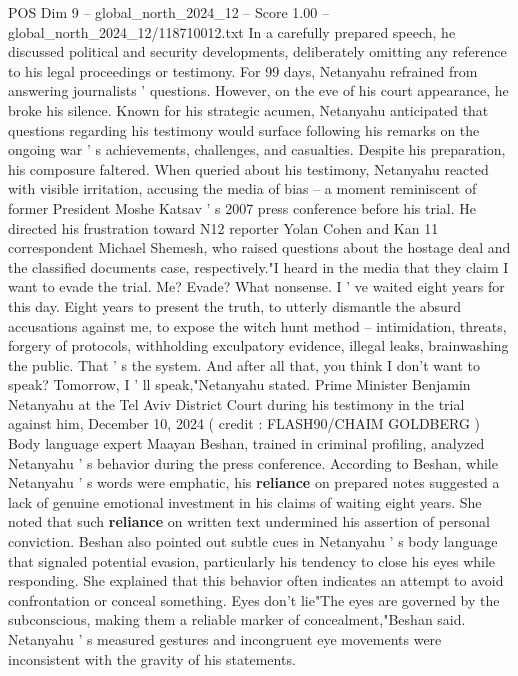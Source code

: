\begin{textsample}{POS Dim 9 – global\_north\_2024\_12 – Score 1.00 – global\_north\_2024\_12/118710012.txt}  \label{ex:f9_pos_333}
In a carefully prepared speech, he discussed political and security developments, deliberately omitting any reference to his legal proceedings or testimony.
For 99 days, Netanyahu refrained from answering journalists ' questions.
However, on the eve of his court appearance, he broke his silence.
Known for his strategic acumen, Netanyahu anticipated that questions regarding his testimony would surface following his remarks on the ongoing war ' s achievements, challenges, and casualties.
Despite his preparation, his composure faltered.
When queried about his testimony, Netanyahu reacted with visible irritation, accusing the media of bias -- a moment reminiscent of former President Moshe Katsav ' s 2007 press conference before his trial.
He directed his frustration toward N12 reporter Yolan Cohen and Kan 11 correspondent Michael Shemesh, who raised questions about the hostage deal and the classified documents case, respectively."I heard in the media that they claim I want to evade the trial.
Me?
Evade?
What nonsense.
I ' ve waited eight years for this day.
Eight years to present the truth, to utterly dismantle the absurd accusations against me, to expose the witch hunt method -- intimidation, threats, forgery of protocols, withholding exculpatory evidence, illegal leaks, brainwashing the public.
That ' s the system.
And after all that, you think I don't want to speak?
Tomorrow, I ' ll speak,"Netanyahu stated.
Prime Minister Benjamin Netanyahu at the Tel Aviv District Court during his testimony in the trial against him, December 10, 2024 ( credit : FLASH90/CHAIM GOLDBERG ) Body language expert Maayan Beshan, trained in criminal profiling, analyzed Netanyahu ' s behavior during the press conference.
According to Beshan, while Netanyahu ' s words were emphatic, his \textbf{reliance} on prepared notes suggested a lack of genuine emotional investment in his claims of waiting eight years.
She noted that such \textbf{reliance} on written text undermined his assertion of personal conviction.
Beshan also pointed out subtle cues in Netanyahu ' s body language that signaled potential evasion, particularly his tendency to close his eyes while responding.
She explained that this behavior often indicates an attempt to avoid confrontation or conceal something.
Eyes don't lie"The eyes are governed by the subconscious, making them a reliable marker of concealment,"Beshan said.
Netanyahu ' s measured gestures and incongruent eye movements were inconsistent with the gravity of his statements.

\end{textsample}
